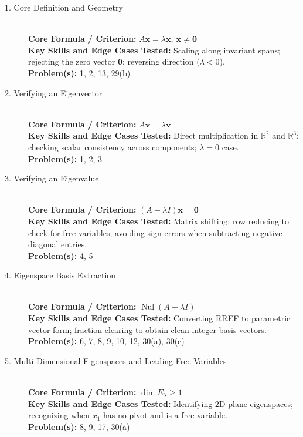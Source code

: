 \documentclass[11pt, letterpaper]{article}
\theoremstyle{definition}
\theoremstyle{remark}
\begin{document}
\begin{description}
    \item[1. Core Definition and Geometry] \hfill \\
    \textbf{Core Formula / Criterion:} $A\mathbf{x} = \lambda\mathbf{x},\ \mathbf{x} \neq \mathbf{0}$ \\
    \textbf{Key Skills and Edge Cases Tested:} Scaling along invariant spans; rejecting the zero vector $\mathbf{0}$; reversing direction ($\lambda < 0$). \\
    \textbf{Problem(s):} 1, 2, 13, 29(b)

    \item[2. Verifying an Eigenvector] \hfill \\
    \textbf{Core Formula / Criterion:} $A\mathbf{v} = \lambda\mathbf{v}$ \\
    \textbf{Key Skills and Edge Cases Tested:} Direct multiplication in $\mathbb{R}^2$ and $\mathbb{R}^3$; checking scalar consistency across components; $\lambda = 0$ case. \\
    \textbf{Problem(s):} 1, 2, 3

    \item[3. Verifying an Eigenvalue] \hfill \\
    \textbf{Core Formula / Criterion:} $(A - \lambda I)\mathbf{x} = \mathbf{0}$ \\
    \textbf{Key Skills and Edge Cases Tested:} Matrix shifting; row reducing to check for free variables; avoiding sign errors when subtracting negative diagonal entries. \\
    \textbf{Problem(s):} 4, 5

    \item[4. Eigenspace Basis Extraction] \hfill \\
    \textbf{Core Formula / Criterion:} $\operatorname{Nul}(A - \lambda I)$ \\
    \textbf{Key Skills and Edge Cases Tested:} Converting RREF to parametric vector form; fraction clearing to obtain clean integer basis vectors. \\
    \textbf{Problem(s):} 6, 7, 8, 9, 10, 12, 30(a), 30(c)

    \item[5. Multi-Dimensional Eigenspaces and Leading Free Variables] \hfill \\
    \textbf{Core Formula / Criterion:} $\dim E_\lambda \ge 1$ \\
    \textbf{Key Skills and Edge Cases Tested:} Identifying $2$D plane eigenspaces; recognizing when $x_1$ has no pivot and is a free variable. \\
    \textbf{Problem(s):} 8, 9, 17, 30(a)


\end{description}
\end{document}
